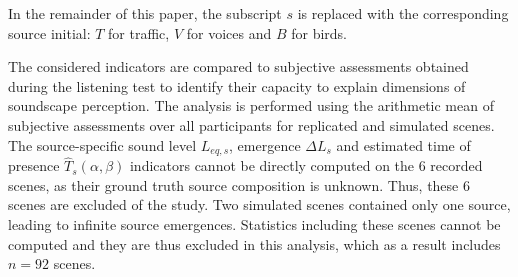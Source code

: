 \documentclass[twocolumn]{article}
\begin{document}
In the remainder of this paper, the subscript $s$ is replaced with the corresponding source initial: $T$ for traffic, $V$ for voices and $B$ for birds.

The considered indicators are compared to subjective assessments obtained during the listening test to identify their capacity to explain dimensions of soundscape perception. The analysis is performed using the arithmetic mean of subjective assessments over all participants for replicated and simulated scenes. The source-specific sound level $L_{eq, s}$, emergence $\Delta L_{s}$ and estimated time of presence $\hat T_s(\alpha, \beta)$ indicators cannot be directly computed on the 6 recorded scenes, as their ground truth source composition is unknown. Thus, these 6 scenes are excluded of the study. Two simulated scenes contained only one source, leading to infinite source emergences. Statistics including these scenes cannot be computed and they are thus excluded in this analysis, which as a result includes $n=92$ scenes.
\end{document}
